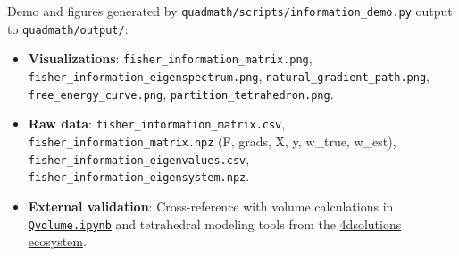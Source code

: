 \documentclass[
]{article}
\providecommand{\tightlist}{%
  \setlength{\itemsep}{0pt}\setlength{\parskip}{0pt}}
\begin{document}
Demo and figures generated by
\texttt{quadmath/scripts/information\_demo.py} output to
\texttt{quadmath/output/}:

\begin{itemize}
\tightlist
\item
  \textbf{Visualizations}: \texttt{fisher\_information\_matrix.png},
  \texttt{fisher\_information\_eigenspectrum.png},
  \texttt{natural\_gradient\_path.png},
  \texttt{free\_energy\_curve.png}, \texttt{partition\_tetrahedron.png}.
\item
  \textbf{Raw data}: \texttt{fisher\_information\_matrix.csv},
  \texttt{fisher\_information\_matrix.npz} (F, grads, X, y, w\_true,
  w\_est), \texttt{fisher\_information\_eigenvalues.csv},
  \texttt{fisher\_information\_eigensystem.npz}.
\item
  \textbf{External validation}: Cross-reference with volume calculations
  in
  \href{https://github.com/4dsolutions/School_of_Tomorrow/blob/master/Qvolume.ipynb}{\texttt{Qvolume.ipynb}}
  and tetrahedral modeling tools from the
  \href{https://github.com/4dsolutions}{4dsolutions ecosystem}.
\end{itemize}
\end{document}
